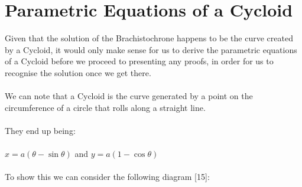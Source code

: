 \documentclass[12pt]{report}
\begin{document}
\section{Parametric Equations of a Cycloid}
Given that the solution of the Brachistochrone happens to be the curve created by a Cycloid, it would only make sense for us to derive the parametric equations of a Cycloid before we proceed to presenting any proofs, in order for us to recognise the solution once we get there.
\\
\\
We can note that a Cycloid is the curve generated by a point on the circumference of a circle that rolls along a straight line.
\\
\\
They end up being:
\\
\\
\(x = a(\theta-\sin{\theta})\) and \(y = a(1-\cos{\theta})\)
\\
\\
To show this we can consider the following diagram [15]:
\\
\\
\end{document}
